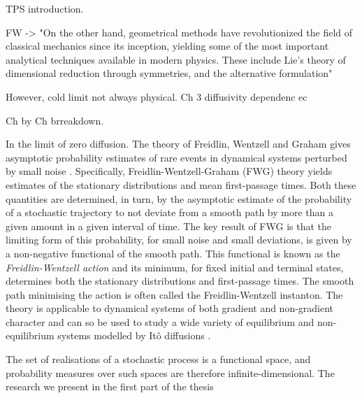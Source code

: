 \documentclass[]{cam-thesis}
\begin{document}
TPS introduction.

FW -> "On the other hand, geometrical methods have revolutionized the field of classical
mechanics since its inception, yielding some of the most important analytical techniques
available in modern physics. These include Lie’s theory of dimensional reduction through
symmetries, and the alternative formulation"

However, cold limit not always physical. Ch 3 diffusivity dependenc ec

Ch by Ch brreakdown.


In the limit of zero diffusion. The theory of Freidlin, Wentzell and Graham \citep{wentzellSmallRandomPerturbations1970, graham1973statistical,graham1987macroscopic}
gives asymptotic probability estimates of rare events in dynamical
systems perturbed by small noise \citep{bolhuisTransitionPathSampling2002a, allen2005sampling, allen2009forward, ebenerInstantonBasedImportance2019b}.
Specifically, Freidlin-Wentzell-Graham (FWG) theory yields estimates of the stationary
distributions and mean first-passage times. Both these quantities
are determined, in turn, by the asymptotic estimate of the probability
of a stochastic trajectory to not deviate from a smooth path by more
than a given amount in a given interval of time. The key result of
FWG is that the limiting form of this probability,
for small noise and small deviations, is given by a non-negative functional
of the smooth path. This functional is known as the \textit{Freidlin-Wentzell action} and its minimum, for fixed initial and terminal states, determines
both the stationary distributions and first-passage times. The smooth
path minimising the action is often called the Freidlin-Wentzell instanton.
The theory is applicable to dynamical systems of both gradient and
non-gradient character and can so be used to study a wide variety
of equilibrium and non-equilibrium systems modelled by Itô diffusions
\citep{paninskiMostLikelyVoltage2006a, huangMolecularMathematicalBasis2012a, bouchet2016generalisation, maier1996scaling, wolynesNavigatingFoldingRoutes1995a, noltingBallsCupsQuasipotentials2016a, mangelBarrierTransitionsDriven1994a, gardnerConstructionGeneticToggle2000a, demarcoPhaseTransitionModel2001a, nelson1987stochastic}.




The set of realisations of a stochastic process is a functional space, and probability measures over such spaces are therefore infinite-dimensional. The research we present in the first part of the thesis 
\end{document}
